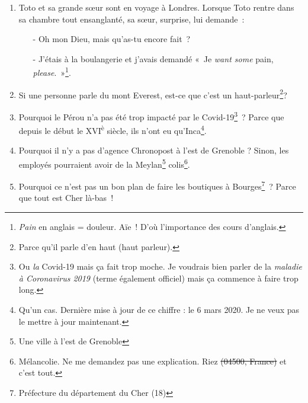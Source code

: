 \documentclass[10pt,a5paper,fullpage]{book}
\begin{document}
\begin{enumerate}
		$\zeta\zeta\zeta\zeta\zeta$ $\zeta\zeta\zeta\zeta\zeta$ $\zeta\zeta\zeta\zeta\zeta$ $\zeta\zeta\zeta\zeta\zeta$  $\zeta\zeta\zeta\zeta\zeta$ \\
		↑ Les Zêta-Unis\footnote{Et en plus, il y a 50 zêtas~! Quelle coïncidence~! (référence aux USA et à ses 50 États).}.			
		\item Toto et sa grande sœur sont en voyage à Londres. Lorsque Toto rentre dans sa chambre tout ensanglanté, sa sœur, surprise, lui demande~:
		\begin{itemize}
			\item[-] Oh mon Dieu, mais qu'as-tu encore fait~?
			\item[-] J’étais à la boulangerie et j’avais demandé « Je \textit{want some} pain, \textit{please}. »\footnote{\textit{Pain} en anglais = douleur. Aïe~! D'où l'importance des cours d'anglais.}.
		\end{itemize}
		\item Si une personne parle du mont Everest, est-ce que c’est un haut-parleur\footnote{Parce qu'il parle d'en haut (haut parleur).}?
		\item Pourquoi le Pérou n'a pas été trop impacté par le Covid-19\footnote{Ou \textit{la} Covid-19 mais ça fait trop moche. Je voudrais bien parler de la \textit{maladie à Coronavirus 2019} (terme également officiel) mais ça commence à faire trop long.}~? Parce que depuis le début le XVI\textsuperscript{è} siècle, ils n'ont eu qu'Inca\footnote{Qu'un cas. Dernière mise à jour de ce chiffre : le 6 mars 2020. Je ne veux pas le mettre à jour maintenant.}.
		\item Pourquoi il n'y a pas d'agence Chronopost à l'est de Grenoble ? Sinon, les employés pourraient avoir de la Meylan\footnote{Une ville à l'est de Grenoble} colis\footnote{Mélancolie. Ne me demandez pas une explication. Riez \sout{(04500, France)} et c'est tout.}. 
		\item Pourquoi ce n'est pas un bon plan de faire les boutiques à Bourges\footnote{Préfecture du département du Cher (18)}~? Parce que tout est Cher là-bas~!
	\end{enumerate}
	
	
\end{document}
